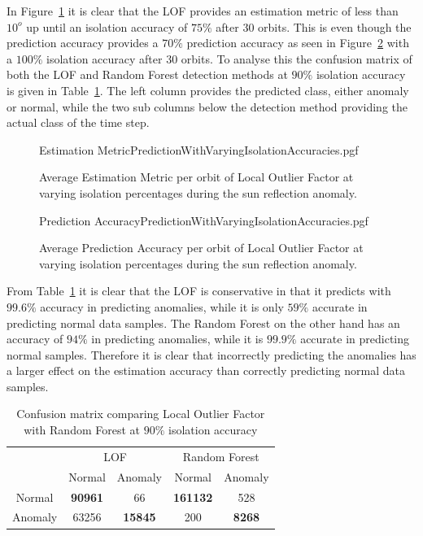 In Figure~\ref{fig:LOFWithVaryingIsolationEstimation} it is clear that the LOF provides an estimation metric of less than $10^o$ up until an isolation accuracy of $75\%$ after $30$ orbits. This is even though the prediction accuracy provides a $70\%$ prediction accuracy as seen in Figure~\ref{fig:LOFWithVaryingIsolationPrediction} with a $100\%$ isolation accuracy after $30$ orbits. To analyse this the confusion matrix of both the LOF and Random Forest detection methods at $90\%$ isolation accuracy is given in Table~\ref{Table: LOFvsRandomForest}. The left column provides the predicted class, either anomaly or normal, while the two sub columns below the detection method providing the actual class of the time step.

\begin{figure}[!htb]
	\centering
	{Estimation MetricPredictionWithVaryingIsolationAccuracies.pgf}
	
	\caption{Average Estimation Metric per orbit of Local Outlier Factor at varying isolation percentages  during the sun reflection anomaly.}
	\label{fig:LOFWithVaryingIsolationEstimation}
\end{figure}

\begin{figure}[!htb]
	\centering
	{Prediction AccuracyPredictionWithVaryingIsolationAccuracies.pgf}
	
	\caption{Average Prediction Accuracy per orbit of Local Outlier Factor at varying isolation percentages  during the sun reflection anomaly.}
	\label{fig:LOFWithVaryingIsolationPrediction}
\end{figure}

From Table~\ref{Table: LOFvsRandomForest} it is clear that the LOF is conservative in that it predicts with $99.6\%$ accuracy in predicting anomalies, while it is only $59\%$ accurate in predicting normal data samples. The Random Forest on the other hand has an accuracy of $94\%$ in predicting anomalies, while it is $99.9\%$ accurate in predicting normal samples. Therefore it is clear that incorrectly predicting the anomalies has a larger effect on the estimation accuracy than correctly predicting normal data samples.

\begin{table}
	\centering
	\caption{Confusion matrix comparing Local Outlier Factor with Random Forest at $90\%$ isolation accuracy}
	\label{Table: LOFvsRandomForest}
	\begin{tabular}{c c c c c}
		\hline\hline
		& \multicolumn{2}{c}{LOF} & \multicolumn{2}{c}{Random Forest}\\
		& Normal & Anomaly & Normal & Anomaly \\ \cline{2-5}
		Normal & \textbf{90961} & 66 & \textbf{161132} & 528\\
		Anomaly & 63256 & \textbf{15845} & 200 & \textbf{8268}\\
		\hline\hline
	\end{tabular}
\end{table}

